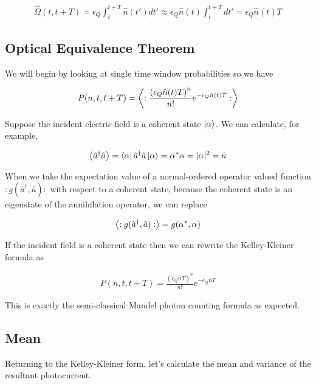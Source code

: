 \documentclass[12pt]{article}
\begin{document}
\begin{align}
\hat{\Omega}(t,t+T) = \epsilon_Q\int_t^{t+T} \hat{n}(t') dt' \approx \epsilon_Q \hat{n}(t) \int_t^{t+T} dt' =  \epsilon_Q \hat{n}(t)T
\end{align} 

\subsection{Optical Equivalence Theorem}

We will begin by looking at single time window probabilities so we have

\begin{align}
P(n,t,t+T) = \Braket{:\frac{\left(\epsilon_Q \hat{n}(t)T \right)^n}{n!}e^{-\epsilon_Q \hat{n}(t) T}:}
\end{align}

Suppose the incident electric field is a coherent state $\ket{\alpha}$. We can calculate, for example,

\begin{align}
\Braket{\hat{a}^{\dag} \hat{a}} = \bra{\alpha}\hat{a}^{\dag} \hat{a} \ket{\alpha} = \alpha^* \alpha = |\alpha|^2 = \bar{n}
\end{align}

When we take the expectation value of a normal-ordered operator valued function $:g(\hat{a}^{\dag},\hat{a}):$ with respect to a coherent state, because the coherent state is an eigenstate of the annihilation operator, we can replace

\begin{align}
\Braket{:g(\hat{a}^{\dag},\hat{a}):} = g(\alpha^*,\alpha)
\end{align}

If the incident field is a coherent state then we can rewrite the Kelley-Kleiner formula as

\begin{align}
P(n,t,t+T) = \frac{\left(\epsilon_Q \bar{n} T\right)^n}{n!} e^{-\epsilon_Q \bar{n}T}
\end{align}

This is exactly the semi-classical Mandel photon counting formula as expected.

\subsection{Mean}

Returning to the Kelley-Kleiner form, let's calculate the mean and variance of the resultant photocurrent.
\end{document}
